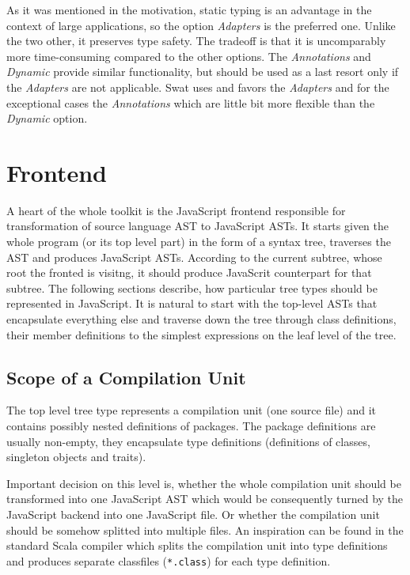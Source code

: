 \documentclass[12pt,a4paper]{report}
\begin{document}
As it was mentioned in the motivation, static typing is an advantage in the context of large applications, so the option {\it Adapters} is the preferred one. Unlike the two other, it preserves type safety. The tradeoff is that it is uncomparably more time-consuming compared to the other options. The {\it Annotations} and {\it Dynamic} provide similar functionality, but should be used as a last resort only if the {\it Adapters} are not applicable. Swat uses and favors the {\it Adapters} and for the exceptional cases the {\it Annotations} which are little bit more flexible than the {\it Dynamic} option.

\section{Frontend}

A heart of the whole toolkit is the JavaScript frontend responsible for transformation of source language AST to JavaScript ASTs. It starts given the whole program (or its top level part) in the form of a syntax tree, traverses the AST and produces JavaScript ASTs. According to the current subtree, whose root the fronted is  visitng, it should produce JavaScrit counterpart for that subtree. The following sections describe, how particular tree types should be represented in JavaScript. It is natural to start with the top-level ASTs that encapsulate everything else and traverse down the tree through class definitions, their member definitions to the simplest expressions on the leaf level of the tree.

\subsection{Scope of a Compilation Unit}

The top level tree type represents a compilation unit (one source file) and it contains possibly nested definitions of packages. The package definitions are usually non-empty, they encapsulate type definitions (definitions of classes, singleton objects and traits).

Important decision on this level is, whether the whole compilation unit should be transformed into one JavaScript AST which would be consequently turned by the JavaScript backend into one JavaScript file. Or whether the compilation unit should be somehow splitted into multiple files. An inspiration can be found in the standard Scala compiler which splits the compilation unit into type definitions and produces separate classfiles (\texttt{*.class}) for each type definition.
\end{document}
